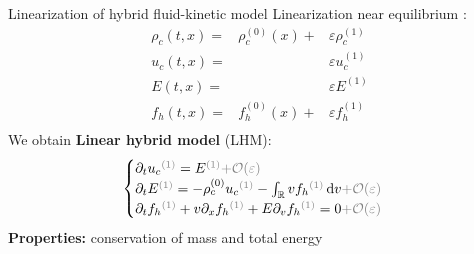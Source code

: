 \documentclass{beamer}
\newcommand{\cmark}{\color{dgreen}\ding{52}}
\newcommand{\mbold}[1]{{\textbf{\color{PLB}#1}}}
\begin{document}
\begin{frame}{Linearization of hybrid fluid-kinetic model}
  Linearization near equilibrium :
  $$
    \begin{aligned}
      \rho_c(t,x) =& \rho_c^{(0)}(x) + &\varepsilon\rho_c^{(1)} \\
         u_c(t,x) =&                   &\varepsilon u_c^{(1)} \\
           E(t,x) =&                   &\varepsilon E^{(1)} \\
         f_h(t,x) =& f_h^{(0)}(x)    + &\varepsilon f_h^{(1)} \\
    \end{aligned}
  $$
  We obtain \mbold{Linear hybrid model} (LHM):
  $$
    \begin{cases}
      \partial_tu_c{\color{gris}^{(1)}}  = E{\color{gris}^{(1)}}  {\color{gris}+ \mathcal{O}(\varepsilon)} \\
      \partial_tE{\color{gris}^{(1)}}    = -\rho_c^{(0)}u_c{\color{gris}^{(1)}} - \int_\mathbb{R}vf_h{\color{gris}^{(1)}}\,\mathrm{d}v {\color{gris}+ \mathcal{O}(\varepsilon)}\\
      \partial_tf_h{\color{gris}^{(1)}}  + v\partial_xf_h{\color{gris}^{(1)}} + E\partial_vf_h{\color{gris}^{(1)}} = 0 {\color{gris}+ \mathcal{O}(\varepsilon)}
    \end{cases}
  $$
  \mbold{Properties:} conservation of mass and total energy \cmark
\end{frame}
\end{document}
